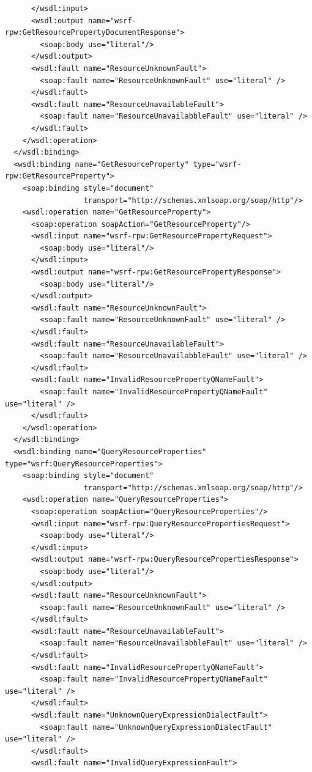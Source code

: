\documentclass{article}                            %
\begin{document}
\begin{footnotesize}
\begin{verbatim}
      </wsdl:input>
      <wsdl:output name="wsrf-rpw:GetResourcePropertyDocumentResponse">
        <soap:body use="literal"/>
      </wsdl:output>
      <wsdl:fault name="ResourceUnknownFault">
        <soap:fault name="ResourceUnknownFault" use="literal" />
      </wsdl:fault>
      <wsdl:fault name="ResourceUnavailableFault">
        <soap:fault name="ResourceUnavailabbleFault" use="literal" />
      </wsdl:fault>
    </wsdl:operation>
  </wsdl:binding>
  <wsdl:binding name="GetResourceProperty" type="wsrf-rpw:GetResourceProperty">
    <soap:binding style="document"
                  transport="http://schemas.xmlsoap.org/soap/http"/>
    <wsdl:operation name="GetResourceProperty">
      <soap:operation soapAction="GetResourceProperty"/>
      <wsdl:input name="wsrf-rpw:GetResourcePropertyRequest">
        <soap:body use="literal"/>
      </wsdl:input>
      <wsdl:output name="wsrf-rpw:GetResourcePropertyResponse">
        <soap:body use="literal"/>
      </wsdl:output>
      <wsdl:fault name="ResourceUnknownFault">
        <soap:fault name="ResourceUnknownFault" use="literal" />
      </wsdl:fault>
      <wsdl:fault name="ResourceUnavailableFault">
        <soap:fault name="ResourceUnavailabbleFault" use="literal" />
      </wsdl:fault>
      <wsdl:fault name="InvalidResourcePropertyQNameFault">
        <soap:fault name="InvalidResourcePropertyQNameFault" use="literal" />
      </wsdl:fault>
    </wsdl:operation>
  </wsdl:binding>
  <wsdl:binding name="QueryResourceProperties" type="wsrf:QueryResourceProperties">
    <soap:binding style="document"
                  transport="http://schemas.xmlsoap.org/soap/http"/>
    <wsdl:operation name="QueryResourceProperties">
      <soap:operation soapAction="QueryResourceProperties"/>
      <wsdl:input name="wsrf-rpw:QueryResourcePropertiesRequest">
        <soap:body use="literal"/>
      </wsdl:input>
      <wsdl:output name="wsrf-rpw:QueryResourcePropertiesResponse">
        <soap:body use="literal"/>
      </wsdl:output>
      <wsdl:fault name="ResourceUnknownFault">
        <soap:fault name="ResourceUnknownFault" use="literal" />
      </wsdl:fault>
      <wsdl:fault name="ResourceUnavailableFault">
        <soap:fault name="ResourceUnavailabbleFault" use="literal" />
      </wsdl:fault>
      <wsdl:fault name="InvalidResourcePropertyQNameFault">
        <soap:fault name="InvalidResourcePropertyQNameFault" use="literal" />
      </wsdl:fault>
      <wsdl:fault name="UnknownQueryExpressionDialectFault">
        <soap:fault name="UnknownQueryExpressionDialectFault" use="literal" />
      </wsdl:fault>
      <wsdl:fault name="InvalidQueryExpressionFault">

\end{verbatim}
\end{footnotesize}
\end{document}
